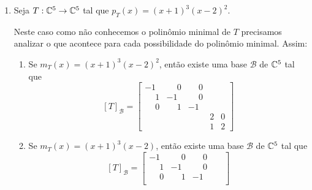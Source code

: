 \begin{exemplo}
\begin{enumerate}[label={\arabic*})]
\begin{solucao}
			Se $r = 1$, ent\~ao
			\[
				[T_2]_{\mathcal{B}_2} = \left[\begin{tabular}{ccc}
 					3 & 0 & 0\\
 					0 & 3 & 0\\
 					0 & 0 & 3
				\end{tabular}
				\right].
			\]
			Se $r = 2$, ent\~ao
			\[
				[T_1]_{\mathcal{B}_1} = \left[\begin{tabular}{cc|c}
 					3 & 0 & \\
 					1 & 3 & \\ \cline{1-3}
 					&  & 3
 				\end{tabular}
				\right].
			\]
			Se $r = 3$, ent\~ao
			\[
				[T_1]_{\mathcal{B}_1} = \left[\begin{tabular}{ccc}
 						3 & 0 & 0 \\
 						1 & 3 & 0 \\
 						0 & 1 & 3
					\end{tabular}
				\right].
			\]
			Logo existem 15 poss{\'\i}veis formas de Jordan para $T$.
		\end{solucao}
		\item Seja $T : \mathbb{C}^5 \to \mathbb{C}^5$ tal que $p_T(x) = (x + 1)^3(x - 2)^2$.
		\begin{solucao}
			Neste caso como n\~ao conhecemos o polin\^omio minimal de $T$ precisamos analizar o que acontece para cada possibilidade do polin\^omio minimal. Assim:
			\begin{enumerate}
				\item Se $m_T(x) = (x + 1)^3(x - 2)^2$, ent\~ao existe uma base $\mathcal{B}$ de $\mathbb{C}^5$ tal que
				\[
					[T]_\mathcal{B} = \begin{bmatrix}
					-1 & \phantom{-}0 & \phantom{-}0 & &\\
					\phantom{-}1 & -1 & \phantom{-}0 & & \\
					\phantom{-}0 & \phantom{-}1 & -1 & &\\
					& & & 2 & 0\\
					& & & 1 & 2
				\end{bmatrix}
				\]
				\item Se $m_T(x) = (x + 1)^3(x - 2)$, ent\~ao existe uma base $\mathcal{B}$ de $\mathbb{C}^5$ tal que
				\[
					[T]_\mathcal{B} = \begin{bmatrix}
					-1 & \phantom{-}0 & \phantom{-}0 & &\\
					\phantom{-}1 & -1 & \phantom{-}0 & & \\
					\phantom{-}0 & \phantom{-}1 & -1 & &\\

\end{bmatrix}\]
\end{enumerate}
\end{solucao}
\end{enumerate}
\end{exemplo}
